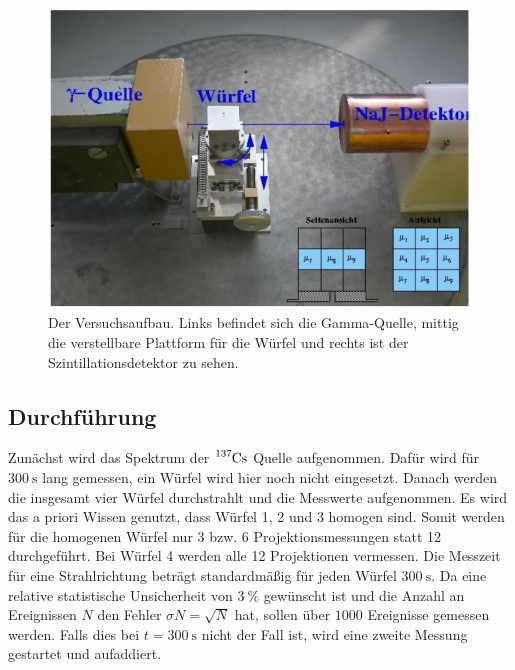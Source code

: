 \begin{figure}[H]
    \centering
    \includegraphics[width=\textwidth]{bilder/Aufbau.png}
    \caption{Der Versuchsaufbau. Links befindet sich die Gamma-Quelle, mittig die verstellbare Plattform für die Würfel und rechts ist der Szintillationsdetektor zu sehen. \cite{anleitung}}
    \label{fig:Aufbau}
\end{figure}

\subsection{Durchführung}
Zunächst wird das Spektrum der $\ce{^{137}Cs}$ Quelle aufgenommen.
Dafür wird für $\SI{300}{\second}$ lang gemessen, ein Würfel wird hier noch nicht eingesetzt.
Danach werden die insgesamt vier Würfel durchstrahlt und die Messwerte aufgenommen.
Es wird das a priori Wissen genutzt, dass Würfel 1, 2 und 3 homogen sind.
Somit werden für die homogenen Würfel nur 3 bzw. 6 Projektionsmessungen statt 12 durchgeführt.
Bei Würfel 4 werden alle 12 Projektionen vermessen.
Die Messzeit für eine Strahlrichtung beträgt standardmäßig für jeden Würfel $\SI{300}{\second}$.
Da eine relative statistische Unsicherheit von $\SI{3}{\percent}$ gewünscht ist und die Anzahl an Ereignissen $N$ den Fehler $\sigma N = \sqrt{N}$ hat, 
sollen über $\num{1000}$ Ereignisse gemessen werden. Falls dies bei $t = \SI{300}{\second}$ nicht der Fall ist, wird eine zweite Messung gestartet und aufaddiert.